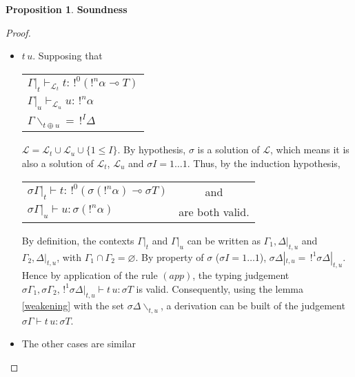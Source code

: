 \documentclass[10pt]{article}
\theoremstyle{plain}
\theoremstyle{definition}
\newtheorem{prop}{Proposition}[section]
\begin{document}
\begin{prop}{\bf Soundness}
\begin{proof}
\begin{itemize}
		\item $t \, u$. Supposing that
			\begin{center}
			\begin{tabular}{l}
				$\Gamma |_t \vdash_{\mathcal{L}_t} t : \,!^0(!^n\alpha \multimap T)$ \\
				$\Gamma |_u \vdash_{\mathcal{L}_u} u : \,!^n\alpha$ \\
				$\Gamma \backslash_{t \oplus u} = \,!^I \Delta$
			\end{tabular}
			\end{center}
			$\mathcal{L} = \mathcal{L}_t \cup \mathcal{L}_u \cup \{ 1 \le I \}$. By hypothesis, $\sigma$ is a solution of $\mathcal{L}$,
			which means it is also a solution of $\mathcal{L}_t$, $\mathcal{L}_u$ and $\sigma I = 1 \dots 1$.
			Thus, by the induction hypothesis,
				\begin{center}
				\begin{tabular}{lc}
					$\sigma \Gamma|_t \vdash t : \,!^0(\sigma (!^n\alpha) \multimap \sigma T)$ & and \\
			  	$\sigma \Gamma|_u \vdash u : \sigma (!^n\alpha)$ & are both valid.
			  \end{tabular}
			  \end{center}
			By definition, the contexts $\Gamma|_t$ and $\Gamma|_u$ can be written as $\Gamma_1, \Delta|_{t, u}$ and $\Gamma_2, \Delta |_{t, u}$,
			with $\Gamma_1 \cap \Gamma_2 = \varnothing$. By property of $\sigma$ ($\sigma I = 1 \dots 1$),
			$\sigma \Delta|_{t, u} = \,!^1 \sigma \Delta|_{t, u}$. Hence by application of the rule $(app)$,
			the typing judgement $\sigma\Gamma_1, \sigma\Gamma_2, \,!^1\sigma\Delta|_{t, u} \vdash t \, u : \sigma T$ is valid.
			Consequently, using the lemma \ref{weakening} with the set $\sigma\Delta \backslash_{t, u}$, a derivation can be built of the judgement
			$\sigma\Gamma \vdash t \, u : \sigma T$.
			
		\item The other cases are similar
		
 		\end{itemize}
	\end{proof}
\end{prop}
\end{document}
